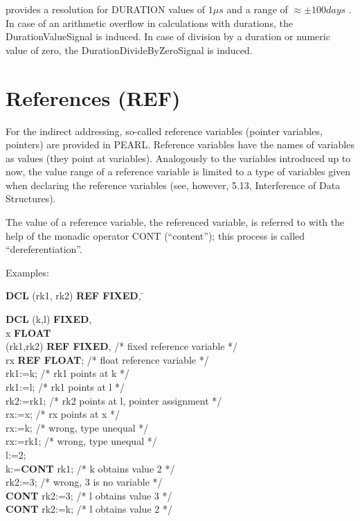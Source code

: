 \OpenPEARL{} provides a resolution for DURATION values of $1\mu s$ 
and
a range of $\approx \pm 100 days$ .
In case of an arithmetic overflow in calculations with durations, the
DurationValueSignal is induced.
In case of division by a duration or numeric value of zero, 
the DurationDivideByZeroSignal is induced.

\section{References (REF)}  %
\label{sec_references}

For the indirect addressing, so-called reference variables (pointer
variables, pointers) are provided in PEARL. Reference variables have the
names of variables as values (they point at variables). Analogously to
the variables introduced up to now, the value range of a reference
variable is limited to a type of variables given when declaring the
reference variables (see, however, 5.13, Interference of Data
Structures).

The value of a reference variable, the referenced variable, is referred
to with the help of the monadic operator CONT (``content''); this
process is called ``dereferentiation''.

Examples:

\begin{tabbing}
{\bf DCL} (rk1, rk2) {\bf REF FIXED}, \= \kill

{\bf DCL} (k,l) {\bf FIXED}, \> \\
\x        x {\bf FLOAT}      \> \\
\x        (rk1,rk2) {\bf REF FIXED}, \> /* fixed reference variable */ \\
\x        rx {\bf REF FLOAT}; \> /* float reference variable */ \\
rk1:=k;   \> /* rk1 points at k */ \\
rk1:=l;   \> /* rk1 points at l */ \\
rk2:=rk1; \> /* rk2 points at l, pointer assignment */ \\
rx:=x;    \> /* rx points at x */ \\
rx:=k;    \> /* wrong, type unequal */ \\
rx:=rk1;  \> /* wrong, type unequal */ \\
l:=2;     \> \\
k:={\bf CONT} rk1; \> /* k obtains value 2 */ \\
rk2:=3;   \> /* wrong, 3 is no variable */ \\
{\bf CONT} rk2:=3; \> /* l obtains value 3 */ \\
{\bf CONT} rk2:=k; \> /* l obtains value 2 */ \\
\end{tabbing}

